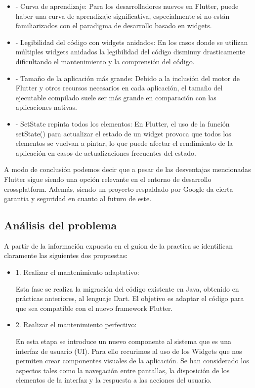 \documentclass{article}
\begin{document}
\begin{itemize}
\item - Curva de aprendizaje: Para los desarrolladores nuevos en Flutter, puede haber una curva de aprendizaje significativa, especialmente si no están familiarizados con el paradigma de desarrollo basado en widgets.
\item - Legibilidad del código con widgets anidados: En los casos donde se utilizan múltiples widgets anidados la legibilidad del código disminuy drasticamente dificultando el mantenimiento y la comprensión del código.
\item - Tamaño de la aplicación más grande: Debido a la inclusión del motor de Flutter y otros recursos necesarios en cada aplicación, el tamaño del ejecutable compilado suele ser más grande en comparación con las aplicaciones nativas.
\item - SetState repinta todos los elementos: En Flutter, el uso de la función setState() para actualizar el estado de un widget provoca que todos los elementos se vuelvan a pintar, lo que puede afectar el rendimiento de la aplicación en casos de actualizaciones frecuentes del estado.
\end{itemize}

A modo de conclusión podemos decir que a pesar de las desventajas mencionadas Flutter sigue siendo una opción relevante en el entorno de desarrollo crossplatform. Además, siendo un proyecto
respaldado por Google da cierta garantia y seguridad en cuanto al futuro de este. 

\subsection{Análisis del problema}
A partir de la información expuesta en el guion de la practica se identifican claramente las siguientes dos propuestas:

    \begin{itemize}
        \item 1. Realizar el mantenimiento adaptativo:

        Esta fase se realiza la migración del código existente en Java, obtenido en prácticas anteriores, al lenguaje Dart. El objetivo es adaptar el código para que sea compatible con el nuevo framework Flutter. 

        \item 2. Realizar el mantenimiento perfectivo:

        En esta etapa se introduce un nuevo componente al sistema que es una interfaz de usuario (UI). Para ello recurimos al uso de los Widgets que nos permiten crear componentes visuales de la aplicación.
        Se han considerado los aspectos tales como la navegación entre pantallas, la disposición de los elementos de la interfaz y la respuesta a las acciones del usuario. 
    \end{itemize}
\end{document}
